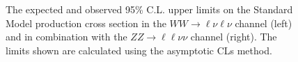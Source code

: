 \begin{figure}[!htbp]
\caption{The expected and observed 95\% C.L. upper limits on the 
Standard Model production cross section in the $WW\rightarrow\ell\nu\ell\nu$ channel (left)
and in combination with the $ZZ\rightarrow\ell\ell\nu\nu$ channel (right).
The limits shown are calculated using the asymptotic CLs method.}
\label{fig:combinarion_asym_fig}
\end{figure}

